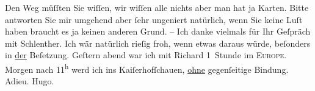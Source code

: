 \begin{ledgroupsized}[t]{13cm}
           \pstart
           Den Weg müſſten Sie wiſſen, wir wiſſen alle nichts aber man hat ja Karten. Bitte
               antworten Sie mir umgehend aber ſehr ungeniert natürlich, wenn Sie keine Luſt haben
               braucht es ja keinen anderen Grund. – Ich danke vielmals {\pb}für Ihr Geſpräch mit Schlenther. Ich wär natürlich rieſig froh, wenn
               etwas daraus würde, beſonders in \uline{der} Beſetzung.\pend
           \pstart
           Geſtern abend war ich mit Richard 1 Stunde im
                  \textsc{Europe}.\pend
           \pstart
           Morgen nach 11\textsuperscript{h} werd ich ins Kaiſerhofſchauen, \uline{ohne}
               gegenſeitige Bindung. Adieu.\pend
           \pstart \spacefill\mbox{Hugo.}\pend{}
         
         \endnumbering{}\end{ledgroupsized}  \newcommand{\dateiname}{L00792}\newcommand{\titel}{Hugo von Hofmannsthal an Arthur Schnitzler, [19. 4. 1898]}\newcommand{\editorInnen}{Martin Anton Müller und Gerd-Hermann Susen}
      